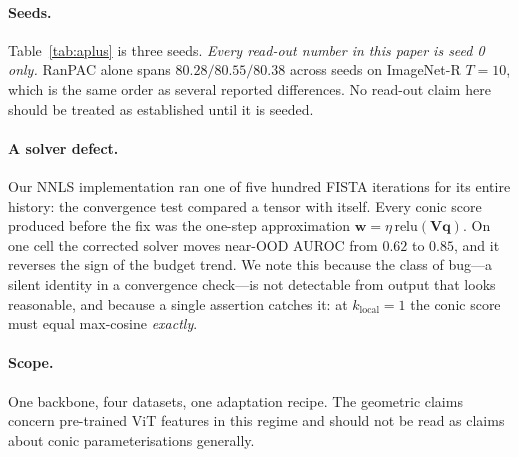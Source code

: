 \documentclass[10pt,twocolumn]{article}
\newcommand{\bq}{\mathbf{q}}
\newcommand{\bw}{\mathbf{w}}
\newcommand{\bV}{\mathbf{V}}
\begin{document}
\paragraph{Seeds.} Table~\ref{tab:aplus} is three seeds. \emph{Every read-out
number in this paper is seed 0 only.} RanPAC alone spans $80.28/80.55/80.38$
across seeds on ImageNet-R $T{=}10$, which is the same order as several reported
differences. No read-out claim here should be treated as established until it is
seeded.

\paragraph{A solver defect.} Our NNLS implementation ran one of five hundred
FISTA iterations for its entire history: the convergence test compared a tensor
with itself. Every conic score produced before the fix was the one-step
approximation $\bw = \eta\,\mathrm{relu}(\bV\bq)$. On one cell the corrected
solver moves near-OOD AUROC from $0.62$ to $0.85$, and it reverses the sign of the
budget trend. We note this because the class of bug---a silent identity in a
convergence check---is not detectable from output that looks reasonable, and
because a single assertion catches it: at $k_{\text{local}}{=}1$ the conic score
must equal max-cosine \emph{exactly}.

\paragraph{Scope.} One backbone, four datasets, one adaptation recipe. The
geometric claims concern pre-trained ViT features in this regime and should not
be read as claims about conic parameterisations generally.
\end{document}
